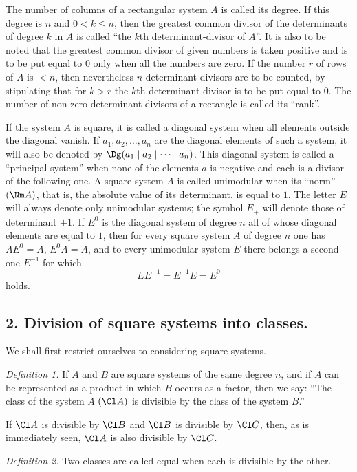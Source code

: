 The number of columns of a rectangular system $A$ is called its degree. If this degree is $n$ and $0<k\le n$, then the greatest common divisor of the determinants of degree $k$ in $A$ is called ``the $k$th determinant-divisor of $A$''. It is also to be noted that the greatest common divisor of given numbers is taken positive and is to be put equal to $0$ only when all the numbers are zero. If the number $r$ of rows of $A$ is $<n$, then nevertheless $n$ determinant-divisors are to be counted, by stipulating that for $k>r$ the $k$th determinant-divisor is to be put equal to $0$. The number of non-zero determinant-divisors of a rectangle is called its ``rank''.

If the system $A$ is square, it is called a diagonal system when all elements outside the diagonal vanish. If $a_1,a_2,\ldots,a_n$ are the diagonal elements of such a system, it will also be denoted by $\Dg(a_1\mid a_2\mid\cdots\mid a_n)$. This diagonal system is called a ``principal system'' when none of the elements $a$ is negative and each is a divisor of the following one. A square system $A$ is called unimodular when its ``norm'' $(\Nm A)$, that is, the absolute value of its determinant, is equal to $1$. The letter $E$ will always denote only unimodular systems; the symbol $E_+$ will denote those of determinant $+1$. If $E^0$ is the diagonal system of degree $n$ all of whose diagonal elements are equal to $1$, then for every square system $A$ of degree $n$ one has $AE^0=A$, $E^0A=A$, and to every unimodular system $E$ there belongs a second one $E^{-1}$ for which
\[
EE^{-1}=E^{-1}E=E^0
\]
holds.

\subsection*{2. Division of square systems into classes.}

We shall first restrict ourselves to considering square systems.

\emph{Definition 1.} If $A$ and $B$ are square systems of the same degree $n$, and if $A$ can be represented as a product in which $B$ occurs as a factor, then we say: ``The class of the system $A$ $(\Cl A)$ is divisible by the class of the system $B$.''

If $\Cl A$ is divisible by $\Cl B$ and $\Cl B$ is divisible by $\Cl C$, then, as is immediately seen, $\Cl A$ is also divisible by $\Cl C$.

\emph{Definition 2.} Two classes are called equal when each is divisible by the other.


